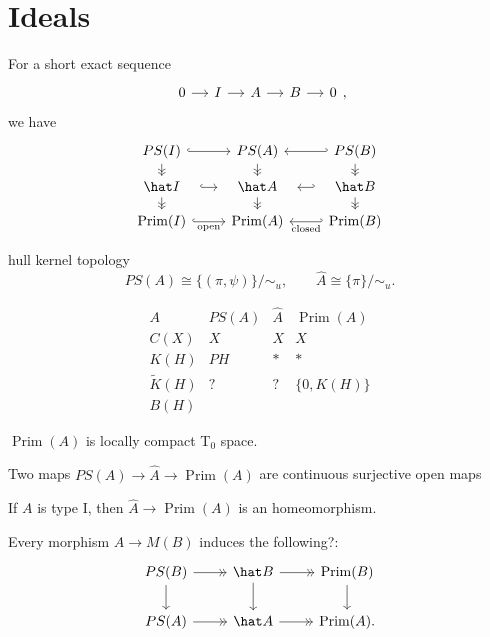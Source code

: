 \documentclass{../../large}
\newcommand{\Prim}{\operatorname{Prim}}
\begin{document}
\section{Ideals}

For a short exact sequence
\[\begin{tikzcd}[column sep=small]0\rar&I\rar&A\rar&B\rar&0\end{tikzcd},\]
we have
\[\begin{tikzcd}[row sep=small]
PS(I) \dar[->>]\rar[hook] & PS(A) \dar[->>] & PS(B) \dar[->>]\lar[hook'] \\
\hat I \dar[->>]\rar[hook,shorten >= 10, shorten <= 10] & \hat A \dar[->>] & \hat B \dar[->>]\lar[hook',shorten >= 10, shorten <= 10] \\
\Prim(I) \rar[hook,swap]{\text{open}} & \Prim(A) & \Prim(B) \lar[hook']{\text{closed}}
\end{tikzcd}\]




\begin{prb}
\end{prb}

\begin{prb}
hull kernel topology
\[PS(A)\cong\{(\pi,\psi)\}/\sim_u,\qquad\hat A\cong\{\pi\}/\sim_u.\]

\[\begin{array}{c|ccc}
A & PS(A) & \hat A & \Prim(A) \\\hline
C(X) & X & X & X \\
K(H) & PH & * & * \\
\tilde K(H) & ? & ? & \{0,K(H)\} \\
B(H) &&&
\end{array}\]
\begin{parts}
\item $\Prim(A)$ is locally compact T$_0$ space.
\item Two maps $PS(A)\to\hat A\to\Prim(A)$ are continuous surjective open maps
\item If $A$ is type I, then $\hat A\to\Prim(A)$ is an homeomorphism.
\end{parts}

\end{prb}




Every morphism $A\to M(B)$ induces the following?:
\[\begin{tikzcd}
PS(B) \rar[->>]\dar & \hat B \rar[->>]\dar & \Prim(B) \dar \\
PS(A) \rar[->>] & \hat A \rar[->>] & \Prim(A).
\end{tikzcd}\]
\end{document}

